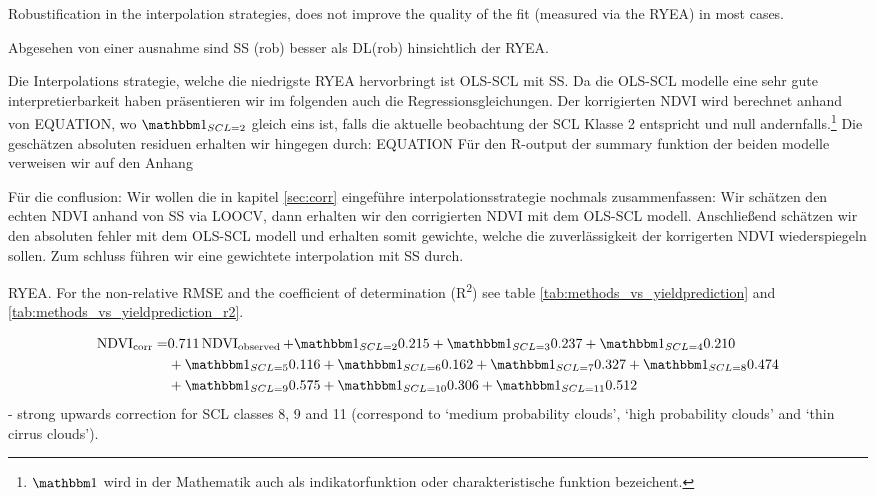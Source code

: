 	Robustification in the interpolation strategies, does not improve the quality of the fit (measured via the RYEA) in most cases. 

	Abgesehen von einer ausnahme sind SS (rob) besser als DL(rob) hinsichtlich der RYEA.

	Die Interpolations strategie, welche die niedrigste RYEA hervorbringt ist OLS-SCL mit SS. Da die OLS-SCL modelle eine sehr gute interpretierbarkeit haben präsentieren wir im folgenden auch die Regressionsgleichungen. Der korrigierten NDVI wird berechnet anhand von EQUATION, wo $\mathbbm 1_{{SCL = 2}}$ gleich eins ist, falls die aktuelle beobachtung der SCL Klasse 2 entspricht und null andernfalls.\footnote{$\mathbbm 1$ wird in der Mathematik auch als indikatorfunktion oder charakteristische funktion bezeichent.} Die geschätzen absoluten residuen erhalten wir hingegen durch: EQUATION  
	Für den R-output der summary funktion der beiden modelle verweisen wir auf den Anhang 

	Für die conflusion:
	Wir wollen die in kapitel \ref{sec:corr} eingeführe interpolationsstrategie nochmals zusammenfassen: Wir schätzen den echten NDVI anhand von SS via LOOCV, dann erhalten wir den corrigierten NDVI mit dem OLS-SCL modell. Anschließend schätzen wir den absoluten fehler mit dem OLS-SCL modell und erhalten somit gewichte, welche die zuverlässigkeit der korrigerten NDVI wiederspiegeln sollen. Zum schluss führen wir eine gewichtete interpolation mit SS durch.



\begin{table}
	\begin{center}
		\caption{RYEA. For the non-relative RMSE and the coefficient of determination (R\textsuperscript{2}) see table \ref{tab:methods_vs_yieldprediction} and \ref{tab:methods_vs_yieldprediction_r2}.}
		\small
		
		\label{tab:methods_vs_yieldprediction_relative}
		\normalsize
	\end{center}
\end{table}



\begin{equation}\label{eq:corr_lm}
	\begin{aligned}		
		{\operatorname{NDVI}}_{\text{corr}}  = &
		0.711 \operatorname{NDVI}_\text{observed}  
		+ \mathbbm 1_{{SCL = 2}} 0.215 
		+ \mathbbm 1_{{SCL = 3}} 0.237 
		+ \mathbbm 1_{{SCL = 4}} 0.210 \\ &
		+ \mathbbm 1_{{SCL = 5}} 0.116 
		+ \mathbbm 1_{{SCL = 6}} 0.162 
		+ \mathbbm 1_{{SCL = 7}} 0.327 
		+ \mathbbm 1_{{SCL = 8}} 0.474 \\ &
		+ \mathbbm 1_{{SCL = 9}} 0.575 
		+ \mathbbm 1_{{SCL = 10}} 0.306 
		+ \mathbbm 1_{{SCL = 11}} 0.512 
	\end{aligned}
\end{equation}
- strong upwards correction for SCL classes 8, 9 and 11 (correspond to `medium probability clouds', `high probability clouds' and `thin cirrus clouds').

